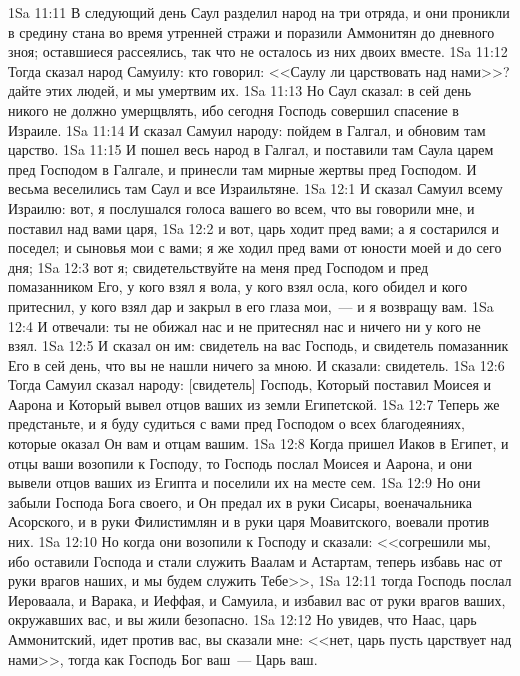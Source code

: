 \vs 1Sa 11:11 В следующий день Саул разделил народ на три отряда, и они проникли в средину стана во время утренней стражи и поразили Аммонитян до дневного зноя; оставшиеся рассеялись, так что не осталось из них двоих вместе.
\vs 1Sa 11:12 Тогда сказал народ Самуилу: кто говорил: <<Саулу ли царствовать над нами>>? дайте этих людей, и мы умертвим их.
\vs 1Sa 11:13 Но Саул сказал: в сей день никого не должно умерщвлять, ибо сегодня Господь совершил спасение в Израиле.
\vs 1Sa 11:14 И сказал Самуил народу: пойдем в Галгал, и обновим там царство.
\vs 1Sa 11:15 И пошел весь народ в Галгал, и поставили там Саула царем пред Господом в Галгале, и принесли там мирные жертвы пред Господом. И весьма веселились там Саул и все Израильтяне.
\vs 1Sa 12:1 И сказал Самуил всему Израилю: вот, я послушался голоса вашего во всем, что вы говорили мне, и поставил над вами царя,
\vs 1Sa 12:2 и вот, царь ходит пред вами; а я состарился и поседел; и сыновья мои с вами; я же ходил пред вами от юности моей и до сего дня;
\vs 1Sa 12:3 вот я; свидетельствуйте на меня пред Господом и пред помазанником Его, у кого взял я вола, у кого взял осла, кого обидел и кого притеснил, у кого взял дар и закрыл в  его глаза мои,~--- и я возвращу вам.
\vs 1Sa 12:4 И отвечали: ты не обижал нас и не притеснял нас и ничего ни у кого не взял.
\vs 1Sa 12:5 И сказал он им: свидетель на вас Господь, и свидетель помазанник Его в сей день, что вы не нашли ничего за мною. И сказали: свидетель.
\vs 1Sa 12:6 Тогда Самуил сказал народу: [свидетель] Господь, Который поставил Моисея и Аарона и Который вывел отцов ваших из земли Египетской.
\vs 1Sa 12:7 Теперь же предстаньте, и я буду судиться с вами пред Господом о всех благодеяниях, которые оказал Он вам и отцам вашим.
\vs 1Sa 12:8 Когда пришел Иаков в Египет, и отцы ваши возопили к Господу, то Господь послал Моисея и Аарона, и они вывели отцов ваших из Египта и поселили их на месте сем.
\vs 1Sa 12:9 Но они забыли Господа Бога своего, и Он предал их в руки Сисары, военачальника Асорского, и в руки Филистимлян и в руки царя Моавитского,  воевали против них.
\vs 1Sa 12:10 Но когда они возопили к Господу и сказали: <<согрешили мы, ибо оставили Господа и стали служить Ваалам и Астартам, теперь избавь нас от руки врагов наших, и мы будем служить Тебе>>,
\vs 1Sa 12:11 тогда Господь послал Иероваала, и Варака, и Иеффая, и Самуила, и избавил вас от руки врагов ваших, окружавших вас, и вы жили безопасно.
\vs 1Sa 12:12 Но увидев, что Наас, царь Аммонитский, идет против вас, вы сказали мне: <<нет, царь пусть царствует над нами>>, тогда как Господь Бог ваш~--- Царь ваш.
